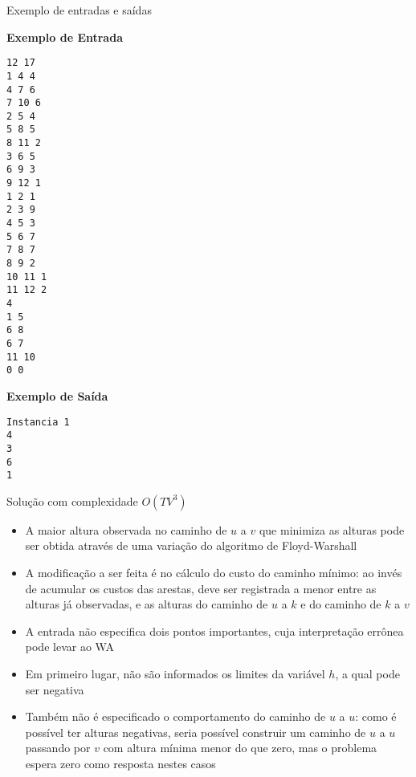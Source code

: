 \begin{frame}[fragile]{Exemplo de entradas e saídas}
\begin{scriptsize}
\begin{minipage}[t]{0.5\textwidth}
\textbf{Exemplo de Entrada}
\begin{verbatim}
12 17
1 4 4
4 7 6
7 10 6
2 5 4
5 8 5
8 11 2
3 6 5
6 9 3
9 12 1
1 2 1
2 3 9
4 5 3
5 6 7
7 8 7
8 9 2
10 11 1
11 12 2
4
1 5
6 8
6 7
11 10
0 0
\end{verbatim}
\end{minipage}
\begin{minipage}[t]{0.45\textwidth}
\textbf{Exemplo de Saída}
\begin{verbatim}
Instancia 1
4
3
6
1
\end{verbatim}
\end{minipage}
\end{scriptsize}
\end{frame}

\begin{frame}[fragile]{Solução com complexidade $O(TV^3)$}

    \begin{itemize}
        \item A maior altura observada no caminho de $u$ a $v$ que minimiza as alturas pode
            ser obtida através de uma variação do algoritmo de Floyd-Warshall

        \item A modificação a ser feita é no cálculo do custo do caminho mínimo: ao invés de
            acumular os custos das arestas, deve ser registrada a menor entre as alturas já
            observadas, e as alturas do caminho de $u$ a $k$ e do caminho de $k$ a $v$

        \item A entrada não especifica dois pontos importantes, cuja interpretação errônea
            pode levar ao WA
            
        \item Em primeiro lugar, não são informados os limites da variável $h$, a qual pode
            ser negativa

        \item Também não é especificado o comportamento do caminho de $u$ a $u$: como é 
            possível ter alturas negativas, seria possível construir um caminho de $u$ a $u$
            passando por $v$ com altura mínima menor do que zero, mas o problema espera zero
            como resposta nestes casos

   \end{itemize}

\end{frame}

